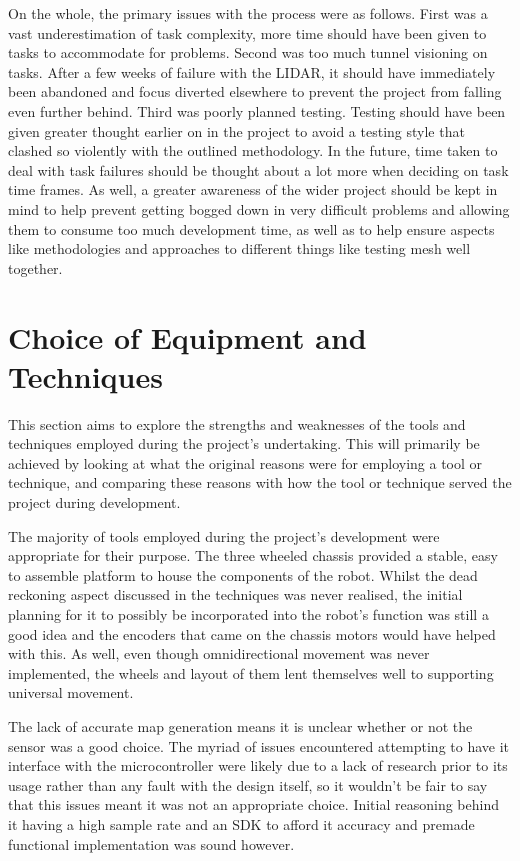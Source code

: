 		On the whole, the primary issues with the process were as follows. First was a vast underestimation of task complexity, more time should have been given to tasks to accommodate for problems. Second was too much tunnel visioning on tasks. After a few weeks of failure with the LIDAR, it should have immediately been abandoned and focus diverted elsewhere to prevent the project from falling even further behind. Third was poorly planned testing. Testing should have been given greater thought earlier on in the project to avoid a testing style that clashed so violently with the outlined methodology. In the future, time taken to deal with task failures should be thought about a lot more when deciding on task time frames. As well, a greater awareness of the wider project should be kept in mind to help prevent getting bogged down in very difficult problems and allowing them to consume too much development time, as well as to help ensure aspects like methodologies and approaches to different things like testing mesh well together.
	
	
		\section{Choice of Equipment and Techniques}
		This section aims to explore the strengths and weaknesses of the tools and techniques employed during the project's undertaking. This will primarily be achieved by looking at what the original reasons were for employing a tool or technique, and comparing these reasons with how the tool or technique served the project during development.
		
		The majority of tools employed during the project's development were appropriate for their purpose. The three wheeled chassis provided a stable, easy to assemble platform to house the components of the robot. Whilst the dead reckoning aspect discussed in the techniques was never realised, the initial planning for it to possibly be incorporated into the robot's function was still a good idea and the encoders that came on the chassis motors would have helped with this. As well, even though omnidirectional movement was never implemented, the wheels and layout of them lent themselves well to supporting universal movement.
		
		The lack of accurate map generation means it is unclear whether or not the sensor was a good choice. The myriad of issues encountered attempting to have it interface with the microcontroller were likely due to a lack of research prior to its usage rather than any fault with the design itself, so it wouldn't be fair to say that this issues meant it was not an appropriate choice. Initial reasoning behind it having a high sample rate and an SDK to afford it accuracy and premade functional implementation was sound however.
		

